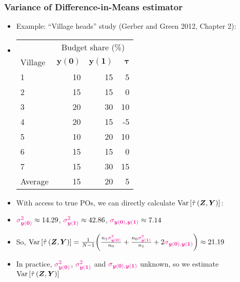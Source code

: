 \documentclass[table, xcolor = {dvipsnames}, 9pt]{beamer}
\theoremstyle{plain}
\newcommand{\mh}[1]{{\color{magenta}{#1}}}
\DeclareMathOperator{\Var}{\rm{Var}}
\begin{document}
\begin{frame}
\frametitle{Variance of Difference-in-Means estimator}
\begin{itemize}
\item Example: ``Village heads'' study (Gerber and Green 2012, Chapter 2): \vspace{0.1in}
\item[]
\begin{center}
\begin{tabular}{l|rrr} \hline
& \multicolumn{3}{c}{Budget share (\%)} \\
Village &$\bm{\bm{y}(\bm{0})}$& $\bm{\bm{y}(\bm{1})}$& $\bm{\tau}$  \\ \hline
1& 10 & 15  & 5  \\
2& 15 & 15  & 0   \\
3& 20 & 30  & 10   \\
4& 20 & 15  & -5   \\
5& 10 & 20  & 10   \\
6& 15 & 15  & 0   \\
7& 15 & 30  & 15   \\ \hline
Average & 15 & 20 & 5  \\ \hline
\end{tabular}
\end{center} \vspace{0.5em} \pause
\item With access to true POs, we can directly calculate $\Var\left[\hat{\tau}\left(\bm{Z}, \bm{Y}\right)\right]$: \vspace{0.5em}
\item[] $\mh{\sigma^2_{\bm{y}(\bm{0})}} \approx 14.29$, $\mh{\sigma^2_{\bm{y}(\bm{1})}} \approx 42.86$, $\mh{\sigma_{\bm{y}(\bm{0}), \bm{y}(\bm{1})}} \approx 7.14$ \vspace{0.5em}
\item So, $\Var\left[\hat{\tau}\left(\bm{Z}, \bm{Y}\right)\right] = \frac{1}{N - 1}\bigg(\frac{n_1 \mh{\sigma^2_{\bm{y}(\bm{0})}}}{n_0} + \frac{n_0 \mh{\sigma^2_{\bm{y}(\bm{1})}}}{n_1} + 2\mh{\sigma_{\bm{y}(\bm{0}), \bm{y}(\bm{1})}}\bigg) \approx 21.19$ \pause \vspace{0.5em}
\item In practice, $\mh{\sigma^2_{\bm{y}(\bm{0})}}$, $\mh{\sigma^2_{\bm{y}(\bm{1})}}$ and $\mh{\sigma_{\bm{y}(\bm{0}), \bm{y}(\bm{1})}}$ unknown, so we estimate $\Var\left[\hat{\tau}\left(\bm{Z}, \bm{Y}\right)\right]$
\end{itemize}
\end{frame}
\end{document}

